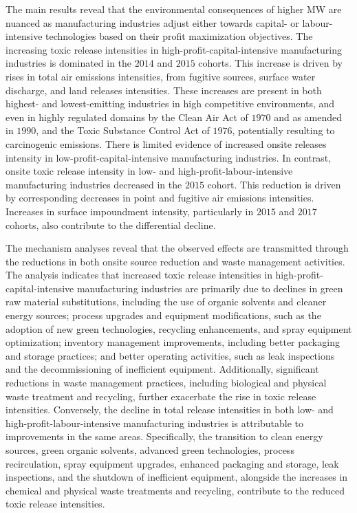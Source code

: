 \documentclass{C:/Users/david/OneDrive/Documents/ULMS/PhD/Thesis/chapter3/src/climate_change/latex/Economic_Journal/OUP-EJ}
\begin{document}
    The main results reveal that the environmental consequences of higher MW are nuanced as manufacturing industries adjust either towards capital- or labour-intensive technologies based on their profit maximization objectives. The increasing toxic release intensities in high-profit-capital-intensive manufacturing industries is dominated in the $2014$ and $2015$ cohorts. This increase is driven by rises in total air emissions intensities, from fugitive sources, surface water discharge, and land releases intensities. These increases are present in both highest- and lowest-emitting industries in high competitive environments, and even in highly regulated domains by the Clean Air Act of $1970$ and as amended in $1990$, and the Toxic Substance Control Act of $1976$, potentially resulting to carcinogenic emissions. There is limited evidence of increased onsite releases intensity in low-profit-capital-intensive manufacturing industries. In contrast, onsite toxic release intensity in low- and high-profit-labour-intensive manufacturing industries decreased in the $2015$ cohort. This reduction is driven by corresponding decreases in point and fugitive air emissions intensities. Increases in surface impoundment intensity, particularly in $2015$ and $2017$ cohorts, also contribute to the differential decline.

    The mechanism analyses reveal that the observed effects are transmitted through the reductions in both onsite source reduction and waste management activities. The analysis indicates that increased toxic release intensities in high-profit-capital-intensive manufacturing industries are primarily due to declines in green raw material substitutions, including the use of organic solvents and cleaner energy sources; process upgrades and equipment modifications, such as the adoption of new green technologies, recycling enhancements, and spray equipment optimization; inventory management improvements, including better packaging and storage practices; and better operating activities, such as leak inspections and the decommissioning of inefficient equipment. Additionally, significant reductions in waste management practices, including biological and physical waste treatment and recycling, further exacerbate the rise in toxic release intensities. Conversely, the decline in total release intensities in both low- and high-profit-labour-intensive manufacturing industries is attributable to improvements in the same areas. Specifically, the transition to clean energy sources, green organic solvents, advanced green technologies, process recirculation, spray equipment upgrades, enhanced packaging and storage, leak inspections, and the shutdown of inefficient equipment, alongside the increases in chemical and physical waste treatments and recycling, contribute to the reduced toxic release intensities.
\end{document}
